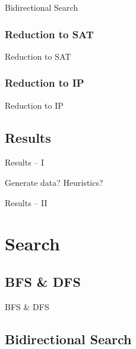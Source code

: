 \documentclass[t,10pt,
mathserif,xcolor=dvipsnames]{beamer}
\begin{document}
\begin{myframe}{Bidirectional Search}

\end{myframe}

\subsubsection{Reduction to SAT}

\begin{myframe}{Reduction to SAT}

\end{myframe}

\subsubsection{Reduction to IP}

\begin{myframe}{Reduction to IP}

\end{myframe}

\subsection{Results}

\begin{myframe}{Results -- I}

  Generate data?
  Heuristics?
  
\end{myframe}

\begin{myframe}{Results -- II}

\end{myframe}


\section{Search}


\subsection{BFS \& DFS}

\begin{myframe}{BFS \& DFS}

\end{myframe}

\subsection{Bidirectional Search}
\end{document}

